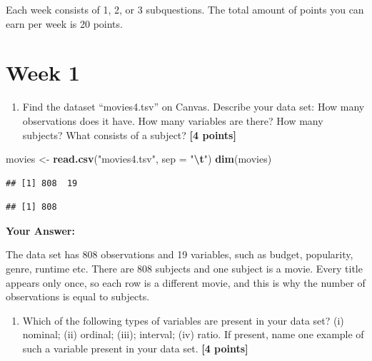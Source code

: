 \documentclass[
]{article}
\newenvironment{Shaded}{\begin{snugshade}}{\end{snugshade}}
\newcommand{\AttributeTok}[1]{\textcolor[rgb]{0.13,0.29,0.53}{#1}}
\newcommand{\FunctionTok}[1]{\textcolor[rgb]{0.13,0.29,0.53}{\textbf{#1}}}
\newcommand{\NormalTok}[1]{#1}
\newcommand{\OtherTok}[1]{\textcolor[rgb]{0.56,0.35,0.01}{#1}}
\newcommand{\SpecialCharTok}[1]{\textcolor[rgb]{0.81,0.36,0.00}{\textbf{#1}}}
\newcommand{\StringTok}[1]{\textcolor[rgb]{0.31,0.60,0.02}{#1}}
\providecommand{\tightlist}{%
  \setlength{\itemsep}{0pt}\setlength{\parskip}{0pt}}
\begin{document}
Each week consists of 1, 2, or 3 subquestions. The total amount of
points you can earn per week is 20 points.

\section{Week 1}\label{week-1}

\begin{enumerate}
\def\labelenumi{\arabic{enumi}.}
\tightlist
\item
  Find the dataset ``movies4.tsv'' on Canvas. Describe your data set:
  How many observations does it have. How many variables are there? How
  many subjects? What consists of a subject? \textbf{[4 points]}
\end{enumerate}

\begin{Shaded}
\begin{Highlighting}[]
\NormalTok{movies }\OtherTok{\textless{}{-}} \FunctionTok{read.csv}\NormalTok{(}\StringTok{"movies4.tsv"}\NormalTok{, }\AttributeTok{sep =} \StringTok{"}\SpecialCharTok{\textbackslash{}t}\StringTok{"}\NormalTok{)}
\FunctionTok{dim}\NormalTok{(movies)}
\end{Highlighting}
\end{Shaded}

\begin{verbatim}
## [1] 808  19
\end{verbatim}

\begin{Shaded}
\end{Shaded}

\begin{verbatim}
## [1] 808
\end{verbatim}

\textbf{Your Answer:}

The data set has 808 observations and 19 variables, such as budget,
popularity, genre, runtime etc. There are 808 subjects and one subject
is a movie. Every title appears only once, so each row is a different
movie, and this is why the number of observations is equal to subjects.

\begin{enumerate}
\def\labelenumi{\arabic{enumi}.}
\setcounter{enumi}{1}
\tightlist
\item
  Which of the following types of variables are present in your data
  set? (i) nominal; (ii) ordinal; (iii); interval; (iv) ratio. If
  present, name one example of such a variable present in your data set.
  \textbf{[4 points]}
\end{enumerate}
\end{document}
